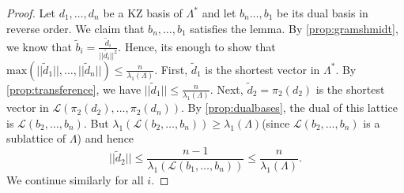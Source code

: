 \begin{proof}
  Let $d_1,\dots,d_n$ be a KZ basis of $\Lambda^*$ and let $b_n\dots,b_1$ be
  its dual basis in reverse order. We claim that $b_n,\dots,b_1$ satisfies the
  lemma. By \ref{prop:gramshmidt}, we know that $\tilde{b}_i
  = \frac{\tilde{d}_i}{||\tilde{d_i}||^2}.$ Hence, its enough to show
  that
  $\mathrm{max}(||\tilde{d}_1||,\dots,||\tilde{d}_n||)\leq\frac{n}{\lambda_1(\Lambda)}$.
  First, $\tilde{d}_1$ is the shortest vector in $\Lambda^*$. By
  \ref{prop:transference}, we have
  $||\tilde{d}_1||\leq\frac{n}{\lambda_1(\Lambda)}$. Next, $\tilde{d}_2
  = \pi_2(d_2)$ is the shortest vector in
  $\mathcal{L}(\pi_2(d_2),\dots,\pi_2(d_n))$. By \ref{prop:dualbases}, the
  dual of this lattice is $\mathcal{L}(b_2,\dots,b_n).$ But
  $\lambda_1(\mathcal{L}(b_2,\dots,b_n))\geq\lambda_1(\Lambda)$(since
  $\mathcal{L}(b_2,\dots,b_n)$ is a sublattice of $\Lambda$) and hence
  \begin{equation}
    ||\tilde{d}_2|| \leq \frac{n-1}{\lambda_1(\mathcal{L}(b_1,\dots,b_n))}\leq
      \frac{n}{\lambda_1(\Lambda)}.
    \end{equation}
    We continue similarly for all $i$.
\end{proof}


